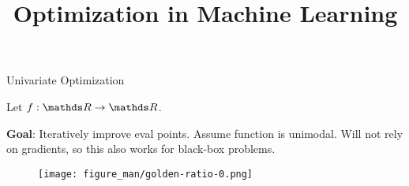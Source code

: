 \documentclass[11pt,compress,t,notes=noshow, xcolor=table]{beamer}
\title{Optimization in Machine Learning}
\begin{document}

\begin{vbframe}{Univariate Optimization}

Let $f: \R \to \R$. 

\lz 

\textbf{Goal}: Iteratively improve eval points. Assume function is unimodal. Will not rely on gradients, so this also works for black-box problems.

\vspace*{-0.2cm} 

\begin{figure}
  \texttt{[image: figure\_man/golden-ratio-0.png]}
\end{figure}

\end{vbframe}
\end{document}
